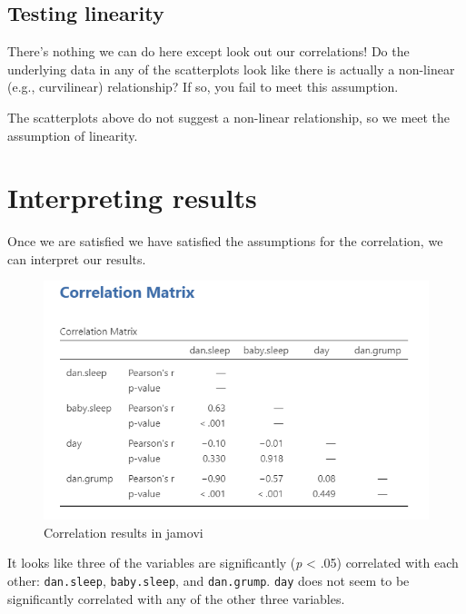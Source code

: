 \documentclass[
]{book}
\begin{document}
\hypertarget{testing-linearity}{%
\subsection{Testing linearity}\label{testing-linearity}}

There's nothing we can do here except look out our correlations! Do the underlying data in any of the scatterplots look like there is actually a non-linear (e.g., curvilinear) relationship? If so, you fail to meet this assumption.

The scatterplots above do not suggest a non-linear relationship, so we meet the assumption of linearity.

\hypertarget{interpreting-results-6}{%
\section{Interpreting results}\label{interpreting-results-6}}

Once we are satisfied we have satisfied the assumptions for the correlation, we can interpret our results.

\begin{figure}

{\centering \includegraphics[width=1\linewidth]{images/08-correlation/correlation-matrix} 

}

\caption{Correlation results in jamovi}\label{fig:unnamed-chunk-9}
\end{figure}

It looks like three of the variables are significantly (\emph{p} \textless{} .05) correlated with each other: \texttt{dan.sleep}, \texttt{baby.sleep}, and \texttt{dan.grump}. \texttt{day} does not seem to be significantly correlated with any of the other three variables.
\end{document}
